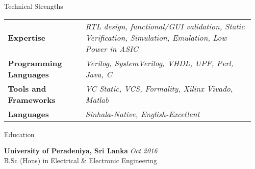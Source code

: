 \documentclass[
11pt, %
]{./assets/resume} %
\begin{document}
\begin{rSection}{Technical Strengths}
	
	\def\arraystretch{1.5}
	
	\begin{tabular}{p{2.0in} p{4.5in}}
		\textbf{Expertise} & \emph{RTL design, functional/GUI validation, Static Verification, Simulation, Emulation, Low Power in ASIC} \\
		\textbf{Programming Languages} & \emph{Verilog, SystemVerilog, VHDL, UPF, Perl, Java, C} \\
		\textbf{Tools and Frameworks} & \emph{VC Static, VCS, Formality, Xilinx Vivado, Matlab} \\ 
		\textbf{Languages} & \emph{Sinhala-Native, English-Excellent} \\
	\end{tabular}
	
\end{rSection}


\begin{rSection}{Education}
	
	\textbf{University of Peradeniya, Sri Lanka} \hfill \textit{Oct 2016} \\ 
	B.Sc (Hons) in Electrical \& Electronic Engineering \\
	
\end{rSection}

\end{document}

